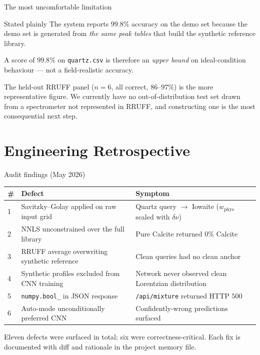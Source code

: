 \documentclass[10pt,aspectratio=169,xcolor=dvipsnames]{beamer}
\newcommand{\code}[1]{\texttt{\small #1}}
\begin{document}
\begin{frame}{The most uncomfortable limitation}
  \begin{block}{Stated plainly}
    The system reports $99.8\%$ accuracy on the demo set because the demo
    set is generated from \emph{the same peak tables} that build the
    synthetic reference library.\medskip

    A score of $99.8\%$ on \code{quartz.csv} is therefore an
    \emph{upper bound} on ideal-condition behaviour --- not a
    field-realistic accuracy.
  \end{block}
  \bigskip
  The held-out RRUFF panel ($n = 6$, all correct, $86$–$97\%$) is the
  more representative figure. We currently have \alert{no out-of-distribution
  test set} drawn from a spectrometer not represented in RRUFF, and
  constructing one is the most consequential next step.
\end{frame}

\section{Engineering Retrospective}

\begin{frame}{Audit findings (May 2026)}
  \begin{table}\centering\footnotesize
    \begin{tabular}{@{}lp{}p{}@{}}
      \toprule
      \textbf{\#} & \textbf{Defect} & \textbf{Symptom}\\
      \midrule
      1 & Savitzky–Golay applied on raw input grid &
          Quartz query $\to$ Iowaite ($w_{\text{phys}}$ scaled with $\delta\nu$)\\
      2 & NNLS unconstrained over the full library &
          Pure Calcite returned $0\%$ Calcite \\
      3 & RRUFF average overwriting synthetic reference &
          Clean queries had no clean anchor \\
      4 & Synthetic profiles excluded from CNN training &
          Network never observed clean Lorentzian distribution \\
      5 & \code{numpy.bool\_} in JSON response &
          \code{/api/mixture} returned HTTP $500$ \\
      6 & Auto-mode unconditionally preferred CNN &
          Confidently-wrong predictions surfaced \\
      \bottomrule
    \end{tabular}
  \end{table}
  \medskip
  Eleven defects were surfaced in total; six were correctness-critical.
  Each fix is documented with diff and rationale in the project memory file.
\end{frame}
\end{document}
